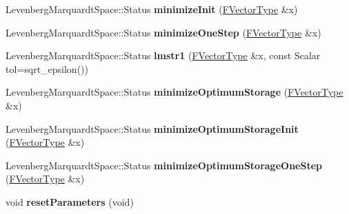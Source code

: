 \begin{DoxyCompactItemize}
\item 
\mbox{\label{class_eigen_1_1_levenberg_marquardt_ad22b48fa04cad42ea372101d3e1e0e72}} 
Levenberg\+Marquardt\+Space\+::\+Status {\bfseries minimize\+Init} (\hyperlink{group___core___module}{F\+Vector\+Type} \&x)
\item 
\mbox{\label{class_eigen_1_1_levenberg_marquardt_a6a9a7e5a6c1acf2bcf3ada782454f31e}} 
Levenberg\+Marquardt\+Space\+::\+Status {\bfseries minimize\+One\+Step} (\hyperlink{group___core___module}{F\+Vector\+Type} \&x)
\item 
\mbox{\label{class_eigen_1_1_levenberg_marquardt_a64a9b31cebebff02579c993166e9dd06}} 
Levenberg\+Marquardt\+Space\+::\+Status {\bfseries lmstr1} (\hyperlink{group___core___module}{F\+Vector\+Type} \&x, const Scalar tol=sqrt\+\_\+epsilon())
\item 
\mbox{\label{class_eigen_1_1_levenberg_marquardt_a9155635b9a341b6b316adf099dee0a81}} 
Levenberg\+Marquardt\+Space\+::\+Status {\bfseries minimize\+Optimum\+Storage} (\hyperlink{group___core___module}{F\+Vector\+Type} \&x)
\item 
\mbox{\label{class_eigen_1_1_levenberg_marquardt_ae030991964c12f229f5e823eb3430191}} 
Levenberg\+Marquardt\+Space\+::\+Status {\bfseries minimize\+Optimum\+Storage\+Init} (\hyperlink{group___core___module}{F\+Vector\+Type} \&x)
\item 
\mbox{\label{class_eigen_1_1_levenberg_marquardt_a3384bfd1e2036f9122cf1d3344a5e3d2}} 
Levenberg\+Marquardt\+Space\+::\+Status {\bfseries minimize\+Optimum\+Storage\+One\+Step} (\hyperlink{group___core___module}{F\+Vector\+Type} \&x)
\item 
\mbox{\label{class_eigen_1_1_levenberg_marquardt_a722c2aee55299d786f79fd7316d6d2cb}} 
void {\bfseries reset\+Parameters} (void)
\item 
\mbox{\label{class_eigen_1_1_levenberg_marquardt_a8cb0d7b10c479262e643a9d2b83ce144}} 

\end{DoxyCompactItemize}
